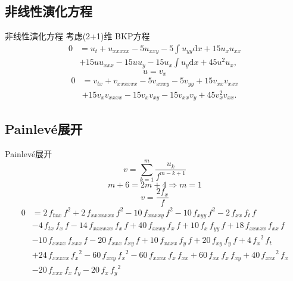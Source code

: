 \documentclass[handout]{beamer}
\newcommand{\dd}[1]{\mathrm{d}#1}
\newcommand{\Painleve}{Painlev{\'e}}
\begin{document}
\subsection{非线性演化方程}
\begin{frame}{非线性演化方程}
考虑(2+1)维 BKP方程
\begin{equation}
\begin{aligned}
0&=u_t+u_{xxxxx}-5u_{xxy}-5\int{u_{yy}\dd{x}}+15u_xu_{xx}\\
&+15uu_{xxx}-15uu_y-15u_x\int{u_y\dd{x}}+45u^2u_x, \label{BKP}
\end{aligned}
\end{equation}
\pause 
\begin{equation}
  u=v_x
\end{equation}
\pause 
\begin{equation}
\begin{aligned}
0&=v_{tx}+v_{xxxxxx}-5v_{xxxy}-5v_{yy}+15v_{xx}v_{xxx}\\
&+15v_xv_{xxxx}-15v_xv_{xy}-15v_{xx}v_y+45v_x^2v_{xx}. \label{BKP-T}
\end{aligned}
\end{equation}
\end{frame}

\subsection{\Painleve{}展开}
\begin{frame}{\Painleve{}展开}
\pause 
\begin{equation}
  v=\sum_{k=1}^m{\frac{u_k}{f^{m-k+1}}}
\end{equation}
\pause 
\begin{equation}
  m+6=2m+4 \Rightarrow m=1
\end{equation}
\pause 
\begin{equation}
  v=\frac{2f_x}{f}
\end{equation}
\pause 
\begin{equation}
\begin{aligned}
0&=2\,{{f}_{txx}}\,{f}^{2}+2\,{{f}_{xxxxxxx}}\,{f}^{2}-10\,{{f}_{xxxxy}}\,{f}^{2}-10\,{{f}_{xyy}}\,{f}^{2}-2\,{{f}_{xx}}\,{{f}_{t}}\,f\\
&-4\,{{f}_{tx}}\,{{f}_{x}}\,f-14\,{{f}_{xxxxxx}}\,{{f}_{x}}\,f+40\,{{f}_{xxxy}}\,{{f}_{x}}\,f+10\,{{f}_{x}}\,{{f}_{yy}}\,f+18\,{{f}_{xxxxx}}\,{{f}_{xx}}\,f\\
&-10\,{{f}_{xxxx}}\,{{f}_{xxx}}\,f-20\,{{f}_{xxx}}\,{{f}_{xy}}\,f+10\,{{f}_{xxxx}}\,{{f}_{y}}\,f+20\,{{f}_{xy}}\,{{f}_{y}}\,f+4\,{{{f}_{x}}}^{2}\,{{f}_{t}}\\
&+24\,{{f}_{xxxxx}}\,{{{f}_{x}}}^{2}-60\,{{f}_{xxy}}\,{{{f}_{x}}}^{2}-60\,{{f}_{xxxx}}\,{{f}_{x}}\,{{f}_{xx}}+60\,{{f}_{xx}}\,{{f}_{x}}\,{{f}_{xy}}+40\,{{{f}_{xxx}}}^{2}\,{{f}_{x}}\\
&-20\,{{f}_{xxx}}\,{{f}_{x}}\,{{f}_{y}}-20\,{{f}_{x}}\,{{{f}_{y}}}^{2}
\end{aligned}
\end{equation}
\end{frame}
\end{document}
